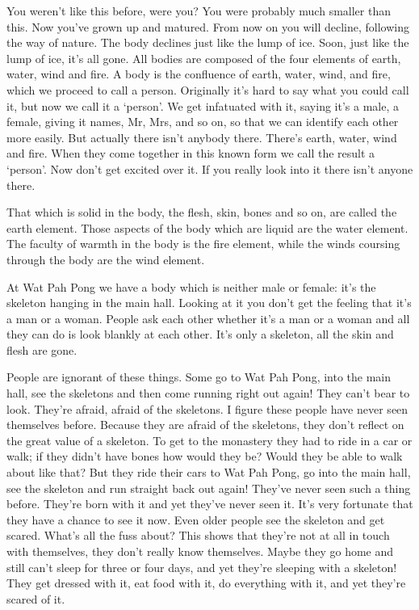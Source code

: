 You weren't like this before, were you? You were probably much smaller than this. Now you've grown up and matured. From now on you will decline, following the way of nature. The body declines just like the lump of ice. Soon, just like the lump of ice, it's all gone. All bodies are composed of the four elements of earth, water, wind and fire. A body is the confluence of earth, water, wind, and fire, which we proceed to call a person. Originally it's hard to say what you could call it, but now we call it a `person'. We get infatuated with it, saying it's a male, a female, giving it names, Mr, Mrs, and so on, so that we can identify each other more easily. But actually there isn't anybody there. There's earth, water, wind and fire. When they come together in this known form we call the result a `person'. Now don't get excited over it. If you really look into it there isn't anyone there. 

That which is solid in the body, the flesh, skin, bones and so on, are called the earth element. Those aspects of the body which are liquid are the water element. The faculty of warmth in the body is the fire element, while the winds coursing through the body are the wind element. 

At Wat Pah Pong we have a body which is neither male or female: it's the skeleton hanging in the main hall. Looking at it you don't get the feeling that it's a man or a woman. People ask each other whether it's a man or a woman and all they can do is look blankly at each other. It's only a skeleton, all the skin and flesh are gone. 

People are ignorant of these things. Some go to Wat Pah Pong, into the main hall, see the skeletons and then come running right out again! They can't bear to look. They're afraid, afraid of the skeletons. I figure these people have never seen themselves before. Because they are afraid of the skeletons, they don't reflect on the great value of a skeleton. To get to the monastery they had to ride in a car or walk; if they didn't have bones how would they be? Would they be able to walk about like that? But they ride their cars to Wat Pah Pong, go into the main hall, see the skeleton and run straight back out again! They've never seen such a thing before. They're born with it and yet they've never seen it. It's very fortunate that they have a chance to see it now. Even older people see the skeleton and get scared. What's all the fuss about? This shows that they're not at all in touch with themselves, they don't really know themselves. Maybe they go home and still can't sleep for three or four days, and yet they're sleeping with a skeleton! They get dressed with it, eat food with it, do everything with it, and yet they're scared of it. 

